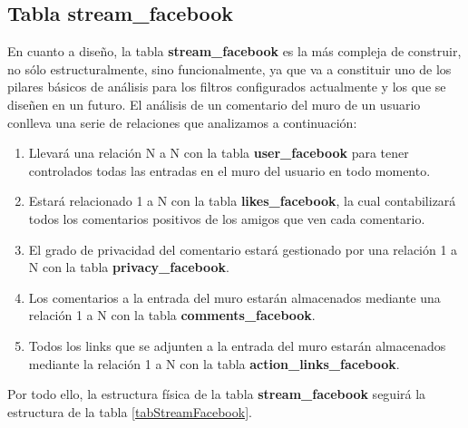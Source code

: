 \subsection{Tabla stream\_facebook}
En cuanto a diseño, la tabla \textbf{stream\_facebook} es la más compleja de construir, no sólo estructuralmente, sino funcionalmente, ya que va a constituir uno de los pilares básicos de análisis para los filtros configurados actualmente y los que se diseñen en un futuro. El análisis de un comentario del muro de un usuario conlleva una serie de relaciones que analizamos a continuación:
\begin{enumerate}
\item Llevará una relación N a N con la tabla \textbf{user\_facebook} para tener controlados todas las entradas en el muro del usuario en todo momento.
\item Estará relacionado 1 a N con la tabla \textbf{likes\_facebook}, la cual contabilizará todos los comentarios positivos de los amigos que ven cada comentario.
\item El grado de privacidad del comentario estará gestionado por una relación 1 a N con la tabla \textbf{privacy\_facebook}.
\item Los comentarios a la entrada del muro estarán almacenados mediante una relación 1 a N con la tabla \textbf{comments\_facebook}.
\item Todos los links que se adjunten a la entrada del muro estarán almacenados mediante la relación 1 a N con la tabla \textbf{action\_links\_facebook}.
\end{enumerate}
\bigskip
\par
Por todo ello, la estructura física de la tabla \textbf{stream\_facebook} seguirá la estructura de la tabla \ref{tabStreamFacebook}.
\bigskip
\par
